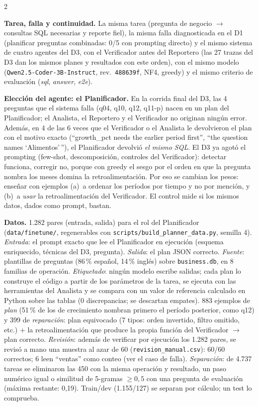 \documentclass[10pt]{article}
\newcommand{\head}[1]{\textbf{\color{ucblue}#1}\hspace{0.4em}}
\begin{document}
\vspace{-2pt}
\begin{multicols}{2}
\small

\head{Tarea, falla y continuidad.} La misma tarea (pregunta de negocio $\rightarrow$ consultas SQL
necesarias y reporte fiel), la misma falla diagnosticada en el D1 (planificar preguntas combinadas:
0/5 con prompting directo) y el mismo sistema de cuatro agentes del D3, con el Verificador antes del
Reportero (las 27 trazas del D3 dan los mismos planes y resultados con este orden), con el mismo modelo
(\texttt{Qwen2.5-Coder-3B-Instruct}, rev.\ \texttt{488639f}, NF4, greedy) y el mismo criterio de
evaluación (\textit{sql}, \textit{answer}, \textit{e2e}).

\head{Elección del agente: el Planificador.} En la corrida final del D3, las 4 preguntas que el
sistema falla (q04, q10, q12, q11-p) nacen en un plan del Planificador; el Analista, el Reportero y
el Verificador no originan ningún error. Además, en 4 de las 6 veces que el Verificador o el Analista
le devolvieron el plan con el motivo exacto (``growth\_pct needs the earlier period first'', ``the
question names `Alimentos'\,''), el Planificador devolvió \emph{el mismo SQL}. El D3 ya agotó el prompting
(few-shot, descomposición, controles del Verificador): detectar funciona, corregir no, porque con
greedy el sesgo por el orden en que la pregunta nombra los meses domina la retroalimentación. Por eso
se cambian los pesos: enseñar con ejemplos (a)~a ordenar los períodos por tiempo y no por mención, y (b)~a
\emph{usar} la retroalimentación del Verificador. El control mide si los mismos datos, dados como
prompt, bastan.

\head{Datos.} 1.282 pares (entrada, salida) para el rol del Planificador
(\texttt{data/finetune/}, regenerables con \texttt{scripts/build\_planner\_data.py}, semilla 4).
\textit{Entrada}: el prompt exacto que lee el Planificador en ejecución (esquema enriquecido,
técnicas del D3, pregunta). \textit{Salida}: el plan JSON correcto. \textit{Fuente}: plantillas de
preguntas (86\,\% español, 14\,\% inglés) sobre \texttt{business.db}, en 8 familias de operación.
\textit{Etiquetado}: ningún modelo escribe salidas; cada plan lo construye el código a partir de los
parámetros de la tarea, se ejecuta con las herramientas del Analista y se compara con un valor de
referencia calculado en Python sobre las tablas (0 discrepancias; se descartan empates).
883 ejemplos de \emph{plan} (51\,\% de los de crecimiento nombran primero el período posterior, como
q12) y 399 de \emph{reparación}: plan equivocado (7 tipos: orden invertido, filtro omitido, etc.)
+ la retroalimentación que produce la propia función del Verificador $\rightarrow$ plan correcto. \textit{Revisión}: además de verificar por
ejecución los 1.282 pares, se revisó a mano una muestra al azar de 60 (\texttt{revision\_manual.csv}):
60/60 correctos; 6 leen ``ventas'' como conteo (ver el caso de falla).
\textit{Separación}: de 4.737 tareas se eliminaron las 450 con la misma operación y resultado, un paso
numérico igual o similitud de 5-gramas $\geq 0{,}5$ con una pregunta de evaluación (máxima restante:
0,19). Train/dev (1.155/127) se separan por cálculo; un test lo comprueba.


\end{multicols}
\end{document}
